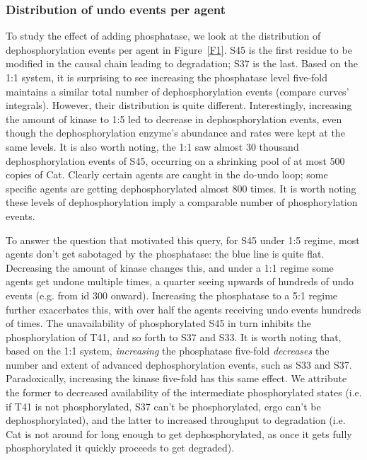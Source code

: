 \subsubsection*{Distribution of undo events per agent}

To study the effect of adding phosphatase, we look at the distribution
of dephosphorylation events per agent in Figure~\ref{F1}. S45 is the
first residue to be modified in the causal chain leading to
degradation; S37 is the last. Based on the 1:1 system, it is surprising
to see increasing the phosphatase level five-fold maintains a similar
total number of dephosphorylation events (compare curves' integrals).
However, their distribution is quite different. Interestingly,
increasing the amount of kinase to 1:5 led to decrease in
dephosphorylation events, even though the dephosphorylation enzyme's
abundance and rates were kept at the same levels. It is also worth
noting, the 1:1 saw almost 30 thousand dephosphorylation events of
S45, occurring on a shrinking pool of at most 500 copies of Cat.
Clearly certain agents are caught in the do-undo loop; some specific
agents are getting dephosphorylated almost 800 times. It is worth
noting these levels of dephosphorylation imply a comparable number of
phosphorylation events.

To answer the question that motivated this query, for S45 under 1:5 regime,
most agents don't get sabotaged by the phosphatase: the blue line is
quite flat. Decreasing the amount of kinase changes this, and
under a 1:1 regime some agents get undone multiple times, a quarter
seeing upwards of hundreds of undo events (e.g. from id 300
onward). Increasing the phosphatase to a 5:1 regime further
exacerbates this, with over half the agents receiving undo events
hundreds of times. The unavailability of phosphorylated S45 in turn
inhibits the phosphorylation of T41, and so forth to S37 and S33. It
is worth noting that, based on the 1:1 system, \emph{increasing} the
phosphatase five-fold \emph{decreases} the number and extent of advanced
dephosphorylation events, such as S33 and S37. Paradoxically,
increasing the kinase five-fold has this same effect. We attribute the
former to decreased availability of the intermediate phosphorylated
states (i.e. if T41 is not phosphorylated, S37 can't be
phosphorylated, ergo can't be dephosphorylated), and the latter to
increased throughput to degradation (i.e. Cat is not around for long
enough to get dephosphorylated, as once it gets fully phosphorylated it
quickly proceeds to get degraded).

